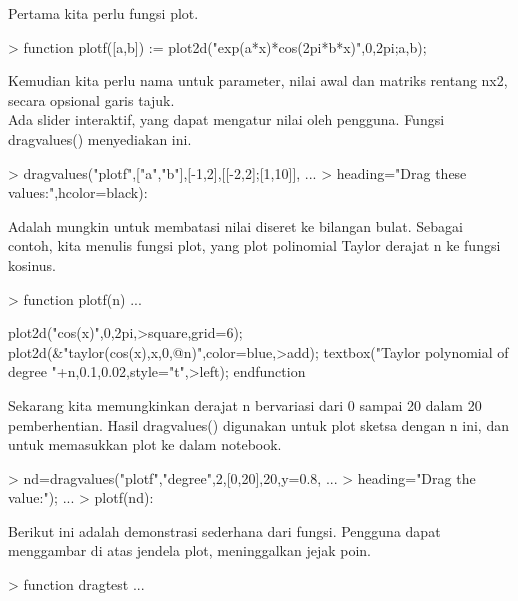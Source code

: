 \documentclass[a4paper,10pt]{article}
\begin{document}
\begin{eulernotebook}
\begin{eulercomment}
\begin{eulercomment}
\begin{eulercomment}
\begin{eulercomment}
\begin{eulercomment}
\begin{eulercomment}
\begin{eulercomment}
Pertama kita perlu fungsi plot.
\end{eulercomment}
\begin{eulerprompt}
> function plotf([a,b]) := plot2d("exp(a*x)*cos(2pi*b*x)",0,2pi;a,b);
\end{eulerprompt}
\begin{eulercomment}
Kemudian kita perlu nama untuk parameter, nilai awal dan matriks
rentang nx2, secara opsional garis tajuk.\\
Ada slider interaktif, yang dapat mengatur nilai oleh pengguna. Fungsi
dragvalues() menyediakan ini.
\end{eulercomment}
\begin{eulerprompt}
> dragvalues("plotf",["a","b"],[-1,2],[[-2,2];[1,10]], ...
>  heading="Drag these values:",hcolor=black):
\end{eulerprompt}
\begin{eulercomment}
Adalah mungkin untuk membatasi nilai diseret ke bilangan bulat.
Sebagai contoh, kita menulis fungsi plot, yang plot polinomial Taylor
derajat n ke fungsi kosinus.
\end{eulercomment}
\begin{eulerprompt}
> function plotf(n) ...
\end{eulerprompt}
\begin{eulerudf}
  plot2d("cos(x)",0,2pi,>square,grid=6);
  plot2d(&"taylor(cos(x),x,0,@n)",color=blue,>add);
  textbox("Taylor polynomial of degree "+n,0.1,0.02,style="t",>left);
  endfunction
\end{eulerudf}
\begin{eulercomment}
Sekarang kita memungkinkan derajat n bervariasi dari 0 sampai 20 dalam
20 pemberhentian. Hasil dragvalues() digunakan untuk plot sketsa
dengan n ini, dan untuk memasukkan plot ke dalam notebook.
\end{eulercomment}
\begin{eulerprompt}
> nd=dragvalues("plotf","degree",2,[0,20],20,y=0.8, ...
>    heading="Drag the value:"); ...
> plotf(nd):
\end{eulerprompt}
\begin{eulercomment}
Berikut ini adalah demonstrasi sederhana dari fungsi. Pengguna dapat
menggambar di atas jendela plot, meninggalkan jejak poin.
\end{eulercomment}
\begin{eulerprompt}
> function dragtest ...
\end{eulerprompt}
\begin{eulerudf}

\end{eulerudf}
\end{eulercomment}
\end{eulercomment}
\end{eulercomment}
\end{eulercomment}
\end{eulercomment}
\end{eulercomment}
\end{eulernotebook}
\end{document}
